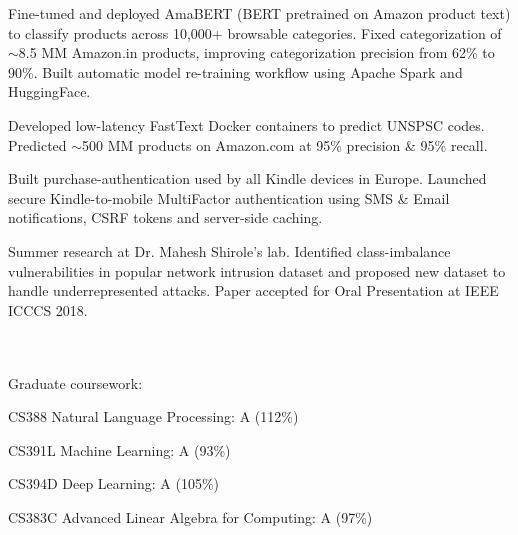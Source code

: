 \documentclass[]{deedy-resume-openfont}
\begin{document}
\begin{tightemize}
    \item Fine-tuned and deployed AmaBERT (BERT pretrained on Amazon product text) to classify products across 10,000+ browsable categories. Fixed categorization of $\sim$8.5 MM Amazon.in products, improving categorization precision from 62\% to 90\%. Built automatic model re-training workflow using Apache Spark and HuggingFace. 
    \item Developed low-latency FastText Docker containers to predict UNSPSC codes. Predicted $\sim$500 MM products on Amazon.com at 95\% precision \& 95\% recall.
\end{tightemize}
\sectionsep

 
\begin{tightemize}
    \item Built purchase-authentication used by all Kindle devices in Europe. Launched secure Kindle-to-mobile \mbox{MultiFactor} authentication using SMS \& Email notifications, CSRF tokens and server-side caching.
\end{tightemize}
\sectionsep

 
\begin{tightemize}
    \item Summer research at Dr. Mahesh Shirole's lab. Identified class-imbalance vulnerabilities in popular network intrusion dataset and proposed new dataset to handle underrepresented attacks. Paper accepted for Oral Presentation at IEEE ICCCS 2018.
\end{tightemize}


 \\
 \\
Graduate coursework:
\begin{tightemize}
    \item CS388 Natural Language Processing: A (112\%)
    \item CS391L Machine Learning: A (93\%)
    \item CS394D Deep Learning: A (105\%)
    \item CS383C Advanced Linear Algebra for Computing: A (97\%)
\end{tightemize}
\sectionsep
\end{document}
